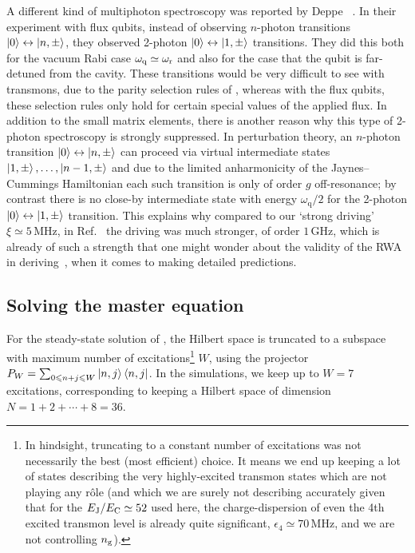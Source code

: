 A different kind of multiphoton spectroscopy was reported by Deppe \etal~\cite{solano_twophoton_2009}. In their experiment with flux qubits, instead of observing $n$-photon transitions $\left\lvert 0 \right\rangle\leftrightarrow\left\lvert n,\pm \right\rangle$, they observed 2-photon $\left\lvert 0 \right\rangle\leftrightarrow\left\lvert 1,\pm \right\rangle$ transitions. They did this both for the vacuum Rabi case $\omega_\text{q}\simeq\omega_{\text{r}}$ and also for the case that the qubit is far-detuned from the cavity. These transitions would be very difficult to see with transmons, due to the parity selection rules of , whereas with the flux qubits, these selection rules only hold for certain special values of the applied flux. In addition to the small matrix elements, there is another reason why this type of 2-photon spectroscopy is strongly suppressed. In perturbation theory, an $n$-photon transition $\left\lvert 0 \right\rangle\leftrightarrow\left\lvert n,\pm \right\rangle$ can proceed via virtual intermediate states $\left\lvert 1,\pm \right\rangle,\ldots,\left\lvert n-1,\pm \right\rangle$ and due to the limited anharmonicity of the Jaynes--Cummings Hamiltonian each such transition is only of order $g$ off-resonance; by contrast there is no close-by intermediate state with energy $\omega_\text{q}/2$ for the 2-photon $\left\lvert 0 \right\rangle\leftrightarrow\left\lvert 1,\pm \right\rangle$ transition. This explains why compared to our `strong driving' $\xi\simeq5\,\text{MHz}$, in Ref.~\cite{solano_twophoton_2009} the driving was much stronger, of order $1\,\text{GHz}$, which is already of such a strength that one might wonder about the validity of the RWA in deriving~, when it comes to making detailed predictions.

\subsection{Solving the master equation}
\label{sec:solvemaster}
For the steady-state solution of , the Hilbert space is truncated to a subspace with maximum number of excitations\footnote{\label{ftn:trnc}In hindsight, truncating to a constant number of excitations was not necessarily the best (most efficient) choice. It means we end up keeping a lot of states describing the very highly-excited transmon states which are not playing any r\^ole (and which we are surely not describing accurately given that for the $E_{\text{J}}/E_{\text{C}}\simeq52$ used here, the charge-dispersion of even the 4th excited transmon level is already quite significant, $\epsilon_4\simeq 70\,\text{MHz}$, and we are not controlling $n_{\text{g}}$).} $W$, using the projector $P_W=\sum_{0\leqslant n+j\leqslant W}\left\lvert n,j \right\rangle\left\langle n,j \right\rvert$.%
In the simulations, we keep up to $W=7$ excitations, corresponding to keeping a Hilbert space of dimension $N=1+2+\cdots+8=36$.

